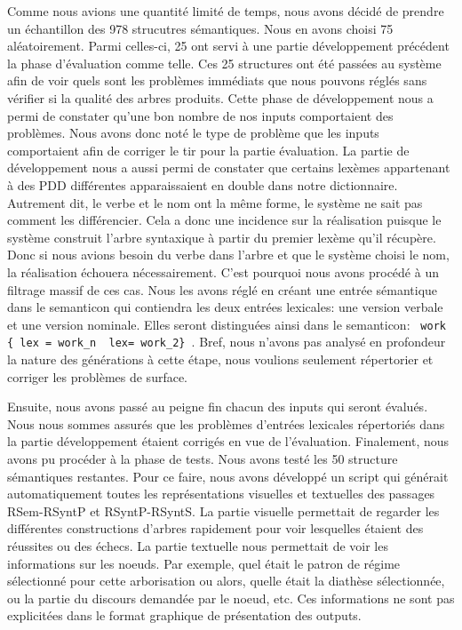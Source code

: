 Comme nous avions une quantité limité de temps, nous avons décidé de prendre un échantillon des 978 strucutres sémantiques. Nous en avons choisi 75 aléatoirement. Parmi celles-ci, 25 ont servi à une partie développement précédent la phase d'évaluation comme telle. Ces 25 structures ont été passées au système afin de voir quels sont les problèmes immédiats que nous pouvons réglés sans vérifier si la qualité des arbres produits. Cette phase de développement nous a permi de constater qu'une bon nombre de nos inputs comportaient des problèmes. Nous avons donc noté le type de problème que les inputs comportaient afin de corriger le tir pour la partie évaluation. La partie de développement nous a aussi permi de constater que certains lexèmes appartenant à des PDD différentes apparaissaient en double dans notre dictionnaire. Autrement dit, le verbe  et le nom  ont la même forme, le système ne sait pas comment les différencier. Cela a donc une incidence sur la réalisation puisque le système construit l'arbre syntaxique à partir du premier lexème qu'il récupère. Donc si nous avions besoin du verbe dans l'arbre et que le système choisi le nom, la réalisation échouera nécessairement. C'est pourquoi nous avons procédé à un filtrage massif de ces cas. Nous les avons réglé en créant une entrée sémantique dans le semanticon qui contiendra les deux entrées lexicales: une version verbale et une version nominale. Elles seront distinguées ainsi dans le semanticon: \lstinline! work { lex = work_n  lex= work_2} !. Bref, nous n'avons pas analysé en profondeur la nature des générations à cette étape, nous voulions seulement répertorier et corriger les problèmes de surface. 

Ensuite, nous avons passé au peigne fin chacun des inputs qui seront évalués. Nous nous sommes assurés que les problèmes d'entrées lexicales répertoriés dans la partie développement étaient corrigés en vue de l'évaluation. Finalement, nous avons pu procéder à la phase de tests. Nous avons testé les 50 structure sémantiques restantes. Pour ce faire, nous avons développé un script qui générait automatiquement toutes les représentations visuelles et textuelles des passages RSem-RSyntP et RSyntP-RSyntS. La partie visuelle permettait de regarder les différentes constructions d'arbres rapidement pour voir lesquelles étaient des réussites ou des échecs. La partie textuelle nous permettait de voir les informations sur les noe{}uds. Par exemple, quel était le patron de régime sélectionné pour cette arborisation ou alors, quelle était la diathèse sélectionnée, ou la partie du discours demandée par le noe{}ud, etc. Ces informations ne sont pas explicitées dans le format graphique de présentation des outputs. 
                              
